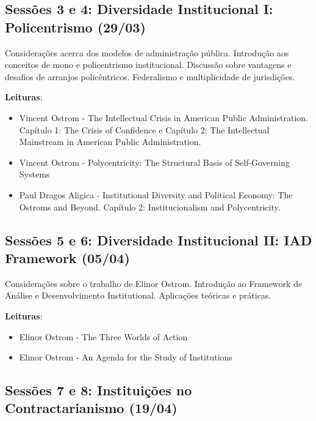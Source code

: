 \documentclass[12pt,]{article}
\providecommand{\tightlist}{%
  \setlength{\itemsep}{0pt}\setlength{\parskip}{0pt}}
\begin{document}
\subsection{Sessões 3 e 4: Diversidade Institucional I: Policentrismo
(29/03)}\label{sessoes-3-e-4-diversidade-institucional-i-policentrismo-2903-1}

Considerações acerca dos modelos de administração pública. Introdução
aos conceitos de mono e policentrismo institucional. Discussão sobre
vantagens e desafios de arranjos policêntricos. Federalismo e
multiplicidade de jurisdições.

\textbf{Leituras}:

\begin{itemize}
\tightlist
\item
  Vincent Ostrom - The Intellectual Crisis in American Public
  Administration. Capítulo 1: The Crisis of Confidence e Capítulo 2: The
  Intellectual Mainstream in American Public Administration.
\item
  Vincent Ostrom - Polycentricity: The Structural Basis of
  Self-Governing Systems
\item
  Paul Dragos Aligica - Institutional Diversity and Political Economy:
  The Ostroms and Beyond. Capítulo 2: Institucionalism and
  Polycentricity.
\end{itemize}

\subsection{Sessões 5 e 6: Diversidade Institucional II: IAD Framework
(05/04)}\label{sessoes-5-e-6-diversidade-institucional-ii-iad-framework-0504}

Considerações sobre o trabalho de Elinor Ostrom. Introdução ao Framework
de Análise e Desenvolvimento Institutional. Aplicações teóricas e
práticas.

\textbf{Leituras}:

\begin{itemize}
\tightlist
\item
  Elinor Ostrom - The Three Worlds of Action
\item
  Elinor Ostrom - An Agenda for the Study of Institutions
\end{itemize}

\subsection{Sessões 7 e 8: Instituições no Contractarianismo
(19/04)}\label{sessoes-7-e-8-instituicoes-no-contractarianismo-1904}
\end{document}

